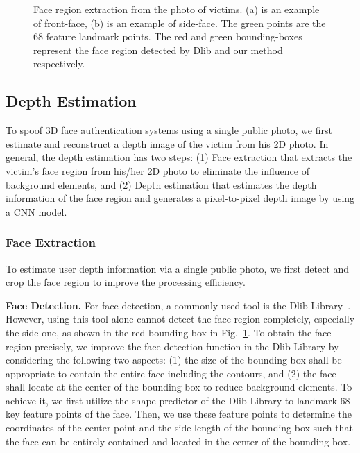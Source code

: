 \begin{figure}[pt]
	\centering
	\vspace{-0.1in}
	\caption{Face region extraction from the photo of victims. (a) is an example of front-face, (b) is an example of side-face. The green points are the 68 feature landmark points. The red and green bounding-boxes represent the face region detected by Dlib and our method respectively.}
	\label{face_extraction}
	\vspace{-0.15in}
\end{figure}

\subsection{Depth Estimation}
To spoof 3D face authentication systems using a single public photo, we first estimate and reconstruct a depth image of the victim from his 2D photo. In general, the depth estimation has two steps: (1) Face extraction that extracts the victim's face region from his/her 2D photo to eliminate the influence of background elements, and (2) Depth estimation that estimates the depth information of the face region and generates a pixel-to-pixel depth image by using a CNN model.

\subsubsection{Face Extraction}
To estimate user depth information via a single public photo, we first detect and crop the face region to  improve the processing efficiency.

\textbf{Face Detection.} For face detection, a commonly-used  tool is the Dlib Library~\cite{dlib09}. However, using this tool alone cannot detect the  face region completely, especially the side one, as shown in the red bounding box in Fig.~\ref{face_extraction}.
To obtain the face region precisely, we improve the face detection function in the  Dlib Library by considering the following two aspects: (1) the size of the bounding box shall be appropriate to contain the entire face including the contours, and (2) the face shall  locate at the center of the bounding box to reduce background elements. To achieve it, we first utilize the shape predictor of the Dlib Library to landmark 68 key feature points of the face. Then, we use these feature points to determine the  coordinates of the center point and the side length of the bounding box such that the face can be entirely contained and located in the center of the bounding box. 

